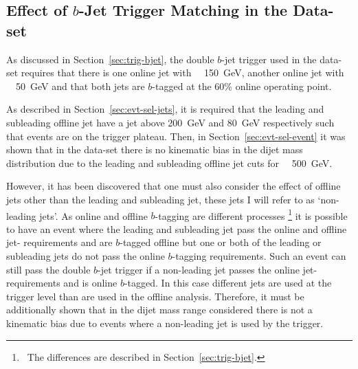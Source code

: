 \subsection{Effect of $b$-Jet Trigger Matching in the \lm{} Data-set}
\label{sec:evt-sel_btrigMatch}

As discussed in Section~\ref{sec:trig-bjet},
the double $b$-jet trigger used in the \lm{} data-set
requires that there is one online jet with \pT{}~\gt~150~GeV,
another online jet with \pT{}~\gt~50~GeV
and that both jets are $b$-tagged at the 60\% online operating point.

As described in Section~\ref{sec:evt-sel-jets}, it is required that the leading and subleading offline jet have a jet \pT{} above
200~GeV and 80~GeV respectively such that events are on the trigger plateau.
Then, in Section~\ref{sec:evt-sel-event} it was shown that in the \lm{} data-set
there is no kinematic bias in the dijet mass distribution due to the leading and subleading offline jet \pT{} cuts for \mjj{}~\gt{}~500~GeV.

However, it has been discovered that one must also consider the effect of offline jets other than the leading and subleading jet,
these jets I will refer to as `non-leading jets'.
As online and offline $b$-tagging are different processes \footnote{\ The differences are described in Section~\ref{sec:trig-bjet}.}
it is possible to have an event where the leading and subleading jet pass the online and offline jet-\pT{} requirements and are $b$-tagged offline
but one or both of the leading or subleading jets do not pass the online $b$-tagging requirements.
Such an event can still pass the double $b$-jet trigger if  a non-leading jet
passes the online jet-\pT{} requirements and is online $b$-tagged.
In this case different jets are used at the trigger level than are used in the offline analysis.
Therefore, it must be additionally shown that in the dijet mass range considered there is not a kinematic bias
due to events where a non-leading jet is used by the trigger.

